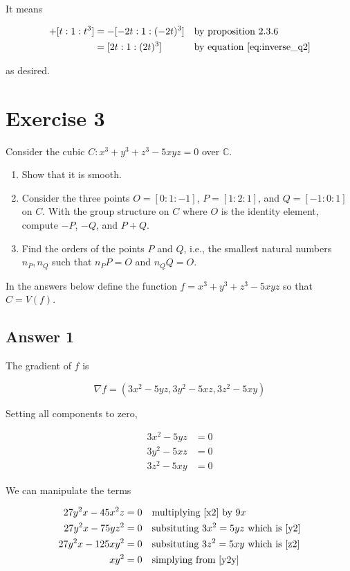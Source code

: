 \documentclass{article}
\theoremstyle{definition}
\theoremstyle{definition}
\theoremstyle{remark}
\begin{document}
It means 

\begin{align*}
	[t: 1: t^3] + [t: 1: t^3] 
	&= -  [-2t: 1: (-2t)^3] &&\text{by proposition 2.3.6}\\
	&= [2t: 1: (2t)^3]	&&\text{by equation \ref{eq:inverse_q2}}
\end{align*}

as desired.

\newpage

\section*{Exercise 3}
Consider the cubic $C: x^3 + y^3 + z^3 - 5xyz = 0$ over $\mathbb{C}$.

\begin{enumerate}
    \item Show that it is smooth.
    \item Consider the three points $O = [0 : 1 : -1]$, $P = [1 : 2 : 1]$, and $Q = [-1 : 0 : 1]$ on $C$. With the group structure on $C$ where $O$ is the identity element, compute $-P$, $-Q$, and $P + Q$.
    \item Find the orders of the points $P$ and $Q$, i.e., the smallest natural numbers $n_P, n_Q$ such that $n_P P = O$ and $n_Q Q = O$.
\end{enumerate}

In the answers below define the function $f = x^3 + y^3 + z^3 - 5xyz$ so that $C = V(f)$.

\subsection*{Answer 1}

The gradient of $f$ is 

$$
\nabla f = (3x^2 - 5yz, 3y^2 - 5xz, 3z^2 - 5xy)
$$

Setting all components to zero, 

\begin{align}
	3x^2 - 5yz &= 0 \label{x2}\\ 
	3y^2 - 5xz &= 0 \label{y2}\\
	3z^2 - 5xy &= 0 \label{z2}
\end{align}

We can manipulate the terms 

\begin{align}
	27y^2x - 45x^2z &= 0 && \text{multiplying \eqref{x2} by }9x \\
	27y^2x - 75yz^2 &= 0 && \text{subsituting } 3x^2 = 5yz \text{ which is }\eqref{y2} \\
	27y^2x - 125xy^2 &= 0 && \text{subsituting } 3z^2 = 5xy \text { which is } \eqref{z2} \label{y2y}\\
	xy^2 &= 0 && \text{simplying from \eqref{y2y}} \label{xy}
\end{align}
\end{document}
